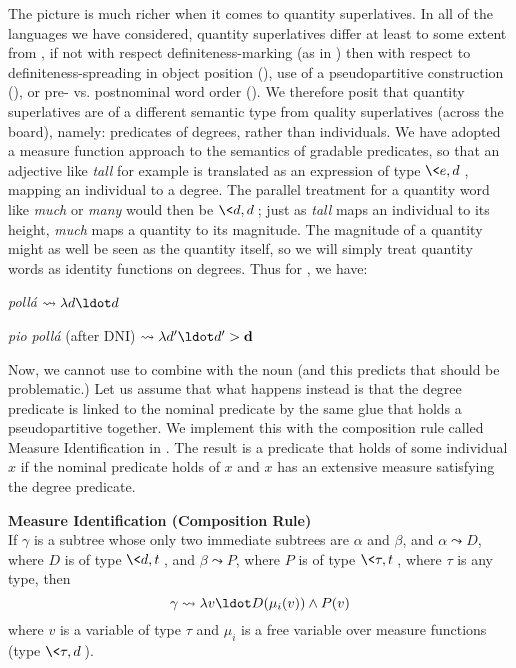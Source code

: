 \documentclass[output=paper
,modfonts
,nonflat]{langsci/langscibook}
\begin{document}
The picture is much richer when it comes to quantity superlatives. In all of the languages we have considered, quantity superlatives differ at least to some extent from , if not with respect definiteness-marking (as in ) then with respect to definiteness-spreading in object position (), use of a pseudopartitive construction (), or pre- vs. postnominal word order (). We therefore posit that quantity superlatives are of a different semantic type from quality superlatives (across the board), namely: predicates of degrees, rather than individuals. We have adopted a measure function approach to the semantics of gradable predicates, so that an adjective like \textit{tall} for example is translated as an expression of type $\<e,d\>$, mapping an individual to a degree. The parallel treatment for a quantity word like \textit{much} or \textit{many} would then be $\<d,d\>$; just as \textit{tall} maps an individual to its height, \textit{much} maps a quantity to its magnitude. The magnitude of a quantity might as well be seen as the quantity itself, so we will simply treat quantity words as identity functions on degrees. Thus for , we have: 

\ea \label{ex:coppockstrand:96} 
\textit{pollá} $\leadsto \lambda d \ldot d$ 
\z 

\ea \label{ex:coppockstrand:97}
\textit{pio pollá} (after DNI) $\leadsto \lambda d' \ldot d' > \textbf{d}$ 
\z 

Now, we cannot use  to combine with the noun (and this predicts that  should be problematic.) Let us assume that what happens instead is that the degree predicate is linked to the nominal predicate by the same glue that holds a pseudopartitive together. We implement this with the composition rule called Measure Identification in . The result is a predicate that holds of some individual $x$ if the nominal predicate holds of $x$ and $x$ has an extensive measure satisfying the degree predicate. 

\ea \label{ex:coppockstrand:98}
\textbf{Measure Identification (Composition Rule)}\\
If $\gamma$ is a subtree whose only two immediate subtrees are $\alpha$ and $\beta$, and $\alpha\leadsto D$, where $D$ is of type $\<d,t\>$, and $\beta\leadsto P$, where $P$ is of type $\<\tau,t\>$, where $\tau$ is any type, then $$\gamma\leadsto \lambda v \ldot D(\mu_i(v)) \land P(v)$$ where $v$ is a variable of type $\tau$ and $\mu_i$ is a free variable over measure functions (type $\<\tau,d\>$).
\z 
\end{document}
